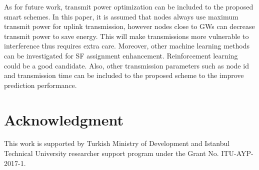 \documentclass[conference]{IEEEtran}
\begin{document}
\par As for future work, transmit power optimization can be included to the proposed smart schemes. In this paper, it is assumed that nodes always use maximum transmit power for uplink transmission, however nodes close to GWs can decrease transmit power to save energy. This will make transmissions more vulnerable to interference thus requires extra care. Moreover, other machine learning methods can be investigated for SF assignment enhancement. Reinforcement learning could be a good candidate. Also, other transmission parameters such as node id and transmission time can be included to the proposed scheme to the improve prediction performance.


\section*{Acknowledgment}
\par This work is supported by Turkish Ministry of Development and Istanbul Technical University researcher support program under the Grant No. ITU-AYP-2017-1.




\end{document}
